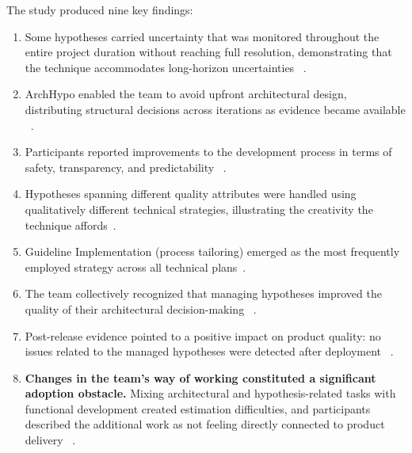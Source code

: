 The study produced nine key findings:

\begin{enumerate}
  \item Some hypotheses carried uncertainty that was monitored throughout the entire
  project duration without reaching full resolution, demonstrating that the technique
  accommodates long-horizon uncertainties ~\citep{silva2024tse}.

  \item ArchHypo enabled the team to avoid upfront architectural design, distributing
  structural decisions across iterations as evidence became available ~\citep{silva2024tse}.

  \item Participants reported improvements to the development process in terms of
  safety, transparency, and predictability ~\citep{silva2024tse}.

  \item Hypotheses spanning different quality attributes were handled using qualitatively
  different technical strategies, illustrating the creativity the technique
  affords~\citep{silva2024tse}.

  \item Guideline Implementation (process tailoring) emerged as the most frequently
  employed strategy across all technical plans~\citep{silva2024tse}.

  \item The team collectively recognized that managing hypotheses improved the quality
  of their architectural decision-making ~\citep{silva2024tse}.

  \item Post-release evidence pointed to a positive impact on product quality: no issues
  related to the managed hypotheses were detected after deployment ~\citep{silva2024tse}.

  \item \textbf{Changes in the team's way of working constituted a significant adoption
  obstacle.} Mixing architectural and hypothesis-related tasks with functional
  development created estimation difficulties, and participants described the additional
  work as not feeling directly connected to product delivery ~\citep{silva2024tse}.


\end{enumerate}
